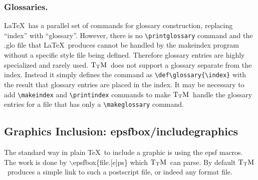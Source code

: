 \documentclass[12pt]{article}
\def\TtM{$\rm{}T_TH$}
\def\TtM{$\rm{}T_TM$}%
\begin{document}
\subsubsection{Glossaries.} \LaTeX\ has a parallel set of commands for
glossary construction, replacing ``index'' with ``glossary''.
However, there is no \verb+\printglossary+ command and the .glo file
that \LaTeX\ produces cannot be handled by the makeindex program
without a specific style file being defined. Therefore glossary
entries are highly specialized and rarely used. \TtM\ does not support
a glossary separate from the index. Instead it simply defines the
command as \verb+\def\glossary{\index}+ with the result that glossary
entries are placed in the index. It may be necessary to add
\verb+\makeindex+ and \verb+\printindex+ commands to make \TtM\ handle
the glossary entries for a file that has only a \verb+\makeglossary+
command.

\subsection{Graphics Inclusion: epsfbox/includegraphics}
\label{epsf}
The standard way in plain \TeX\ to include a graphic is using the epsf
macros. The work is done by $\backslash$epsfbox\{file.[e]ps\} which
\TtM\ can parse. By default \TtM\ produces a simple link to such a
postscript file, or indeed any format file.
\end{document}
